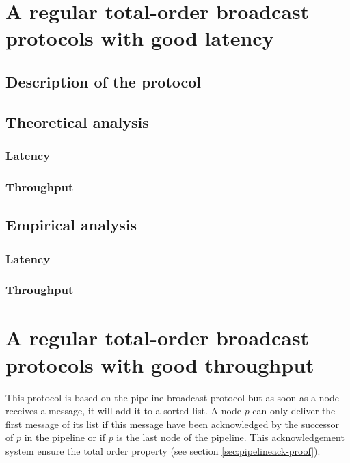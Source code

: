 \documentclass[a4paper]{article}
\begin{document}
\section{A regular total-order broadcast protocols with good latency}

\subsection{Description of the protocol}

\subsection{Theoretical analysis}

\subsubsection*{Latency}

\subsubsection*{Throughput}

\subsection{Empirical analysis}

\subsubsection*{Latency}

\subsubsection*{Throughput}

\section{A regular total-order broadcast protocols with good throughput}
This protocol is based on the pipeline broadcast protocol but as soon as a node
receives a message, it will add it to a sorted list. A node $p$ can only deliver the
first message of its list if this message have been acknowledged by the
successor of $p$ in the pipeline or if $p$ is the last node of the pipeline.
This acknowledgement system ensure the total order property (see section
\ref{sec:pipelineack-proof}).
\end{document}

